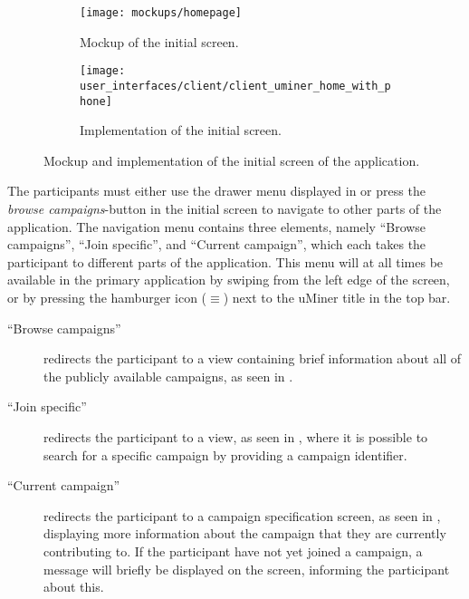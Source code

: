 \begin{figure}[!htbp]
    \begin{subfigure}[!t]{.48\textwidth}
        \centering
        \texttt{[image: mockups/homepage]}
        \caption{Mockup of the initial screen.}
        \label{fig:mockup_initial_screen}
    \end{subfigure}%
    \begin{subfigure}[!t]{.52\textwidth}
    \centering
        \texttt{[image: user\_interfaces/client/client\_uminer\_home\_with\_phone]}
        \caption{Implementation of the initial screen.}
        \label{fig:implementation_initial_screen}
    \end{subfigure}
    \caption{Mockup and implementation of the initial screen of the application.}
    \label{fig:initial_screen}
\end{figure}
\FloatBarrier

The participants must either use the drawer menu displayed in  or press the \emph{browse campaigns}-button in the initial screen to navigate to other parts of the application. The navigation menu contains three elements, namely ``Browse campaigns'', ``Join specific'', and ``Current campaign'', which each takes the participant to different parts of the application. This menu will at all times be available in the primary application by swiping from the left edge of the screen, or by pressing the hamburger icon ($\equiv$) next to the uMiner title in the top bar. 

\begin{description}
    \item[``Browse campaigns''] redirects the participant to a view containing brief information about all of the publicly available campaigns, as seen in .

    \item[``Join specific''] redirects the participant to a view, as seen in , where it is possible to search for a specific campaign by providing a campaign identifier.

    \item[``Current campaign''] redirects the participant to a campaign specification screen, as seen in , displaying more information about the campaign that they are currently contributing to. If the participant have not yet joined a campaign, a message will briefly be displayed on the screen, informing the participant about this.
\end{description}

